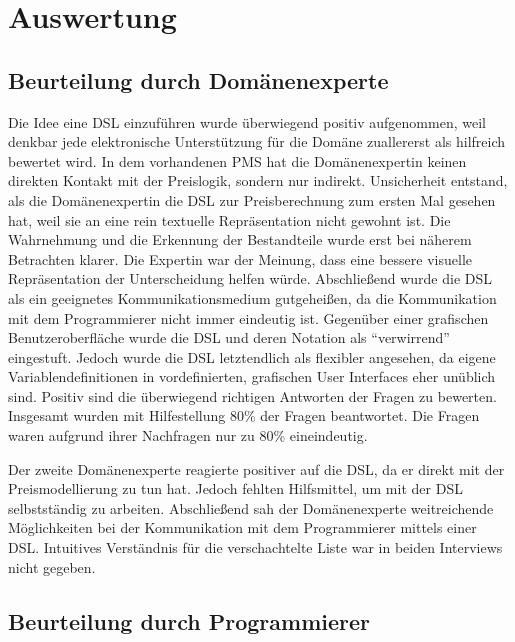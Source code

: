 \documentclass[11pt,english,ngerman, headsepline]{scrreprt}
\begin{document}
  
\chapter{Auswertung}
  

\section{Beurteilung durch Domänenexperte}\label{reaktionExperte}

Die Idee eine DSL einzuführen wurde überwiegend positiv aufgenommen, weil
denkbar jede elektronische Unterstützung für die Domäne zuallererst als
hilfreich bewertet wird.
In dem vorhandenen PMS hat die Domänenexpertin keinen direkten Kontakt mit der
Preislogik, sondern nur indirekt.
Unsicherheit entstand, als die Domänenexpertin die DSL zur Preisberechnung
 zum ersten Mal gesehen hat, weil sie an eine
rein textuelle Repräsentation nicht gewohnt ist. Die Wahrnehmung
und die Erkennung der Bestandteile wurde erst bei näherem Betrachten klarer. 
Die Expertin war der Meinung, dass eine bessere visuelle Repräsentation der
Unterscheidung helfen würde. Abschließend wurde die DSL als ein geeignetes
Kommunikationsmedium gutgeheißen, da die Kommunikation mit dem Programmierer nicht immer eindeutig ist.
Gegenüber einer grafischen Benutzeroberfläche wurde die DSL und deren Notation
als ``verwirrend'' eingestuft. Jedoch wurde die DSL letztendlich als flexibler
angesehen, da eigene Variablendefinitionen in vordefinierten, grafischen User Interfaces eher unüblich sind.
Positiv sind die überwiegend richtigen Antworten der Fragen zu bewerten.
Insgesamt wurden mit Hilfestellung 80\% der Fragen beantwortet. Die Fragen waren
aufgrund ihrer Nachfragen nur zu 80\% eineindeutig.

Der zweite Domänenexperte reagierte positiver auf die DSL, da er direkt mit
der Preismodellierung zu tun hat. Jedoch fehlten Hilfsmittel, um mit der DSL
selbstständig zu arbeiten. Abschließend sah der Domänenexperte weitreichende
Möglichkeiten bei der Kommunikation mit dem Programmierer mittels einer DSL.
Intuitives Verständnis für die verschachtelte Liste war in beiden Interviews
nicht gegeben.



\section{Beurteilung durch Programmierer}\label{reaktionProgrammierer}
 
\end{document}
